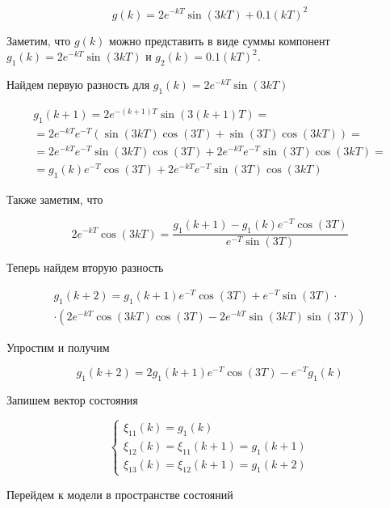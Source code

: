 \begin{equation}
	g(k) = 2 e^{-kT} \sin (3kT) + 0.1(kT)^2
\end{equation}

Заметим, что $g(k)$ можно представить в виде суммы компонент $g_1(k)=2 e^{-kT} \sin (3kT) $ и $g_2(k)=0.1(kT)^2$.

Найдем первую разность для $g_1(k)=2 e^{-kT} \sin (3kT) $

\begin{multline}
	g_1(k+1)=2 e^{-(k+1)T} \sin (3(k+1)T) = \\=
	2 e^{-kT}e^{-T} (\sin (3kT) \cos(3T) + \sin(3T)\cos(3kT))=\\=
	2 e^{-kT}e^{-T}\sin (3kT) \cos(3T) + 2 e^{-kT}e^{-T}\sin(3T)\cos(3kT)=\\=
	g_1(k)e^{-T} \cos(3T) + 2 e^{-kT}e^{-T}\sin(3T)\cos(3kT)
\end{multline}

Также заметим, что

\begin{equation}
	2e^{-kT} \cos(3kT) = \frac{g_1(k+1)-g_1(k)e^{-T} \cos(3T)}{e^{-T}\sin (3T)}
\end{equation}


Теперь найдем вторую разность

\begin{multline}
	g_1(k+2) = g_1(k+1) e^{-T} \cos(3T) + e^{-T} \sin(3T) \cdot \\ \cdot
	\left( 2e^{-kT}\cos(3kT) \cos(3T)-2e^{-kT}\sin (3kT) \sin (3T)\right)
\end{multline}

Упростим и получим

\begin{equation}
	g_1(k+2)= 2g_1(k+1)e^{-T}\cos (3T)-e^{-T}g_1(k)
\end{equation}

Запишем вектор состояния

\begin{equation}
	\begin{cases}
		\xi_{11}(k) = g_1(k)\\
		\xi_{12}(k)= \xi_{11}(k+1) = g_1(k+1)\\
		\xi_{13} (k) = \xi_{12}(k+1) = g_1(k+2)
	\end{cases}
\end{equation}

Перейдем к модели в пространстве состояний

